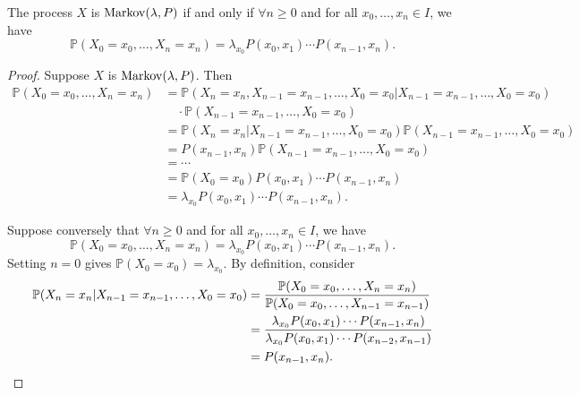\documentclass[a4paper]{article}
\begin{document}
\begin{theorem}\label{thm:1.1}
    The process $X$ is $ \operatorname{Markov}(\lambda,P) $ if and only if $ \forall n\ge 0 $ and for all $ x_0,\dots,x_n\in I $, we have 
    \[
        \mathbb{P}(X_0=x_0,\dots,X_n=x_n) = \lambda_{x_0} P(x_0,x_1)\cdots P(x_{n-1},x_n).
    \]
\end{theorem}
\begin{proof}
    Suppose $ X $ is $ \operatorname{Markov}(\lambda,P) $. Then 
    \begin{align*}
        \mathbb{P}(X_0=x_0,\dots,X_n=x_n) &= \mathbb{P}(X_n=x_n,X_{n-1}=x_{n-1},\dots, X_0=x_0|X_{n-1}=x_{n-1},\dots, X_0=x_0)\\
        &\quad\cdot \mathbb{P}(X_{n-1}=x_{n-1},\dots, X_0=x_0 )\\
        &= \mathbb{P}(X_n=x_n|X_{n-1}=x_{n-1},\dots, X_0=x_0)\mathbb{P}(X_{n-1}=x_{n-1},\dots, X_0=x_0 )\\ 
        &= P(x_{n-1},x_n)\mathbb{P}(X_{n-1}=x_{n-1},\dots, X_0=x_0 )\\ 
        &=\cdots\\ 
        &= \mathbb{P}(X_0=x_0) P(x_0,x_1)\cdots P(x_{n-1},x_n)\\ 
        &= \lambda_{x_0} P(x_0,x_1)\cdots P(x_{n-1},x_n).
    \end{align*}

    Suppose conversely that $ \forall n\ge 0 $ and for all $ x_0,\dots,x_n\in I $, we have 
    \[
        \mathbb{P}(X_0=x_0,\dots,X_n=x_n) = \lambda_{x_0} P(x_0,x_1)\cdots P(x_{n-1},x_n).
    \]
    Setting $n=0$ gives $ \mathbb{P}(X_0=x_0)=\lambda_{x_0} $. By definition, consider 
    \begin{align*}
        \mathbb{P}(X_n=x_n|X_{n-1}=x_{n-1},\dots, X_0=x_0) &= \frac{\mathbb{P}(X_0=x_0,\dots,X_n=x_n)}{\mathbb{P}(X_0=x_0,\dots,X_{n-1}=x_{n-1})}\\ 
        &= \frac{\lambda_{x_0} P(x_0,x_1)\cdots P(x_{n-1},x_n)}{\lambda_{x_0} P(x_0,x_1)\cdots P(x_{n-2},x_{n-1})}\\ 
        &= P(x_{n-1},x_n).\qedhere
    \end{align*}
\end{proof}
\end{document}
